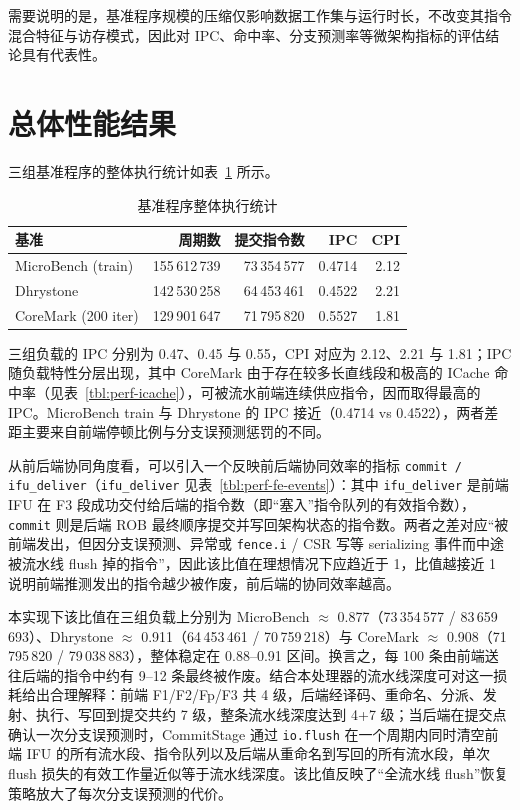 需要说明的是，基准程序规模的压缩仅影响数据工作集与运行时长，不改变其指令混合特征与访存模式，因此对 IPC、命中率、分支预测率等微架构指标的评估结论具有代表性。

\section{总体性能结果}\label{sec:perf-pipeline}

三组基准程序的整体执行统计如表~\ref{tbl:perf-overview} 所示。

\begin{table}[H]
  \centering
  \caption{基准程序整体执行统计}
  \label{tbl:perf-overview}
  \begin{tabular}{lrrrr}
    \toprule
    基准 & 周期数 & 提交指令数 & IPC & CPI \\
    \midrule
    MicroBench (train) & 155\,612\,739 & 73\,354\,577 & 0.4714 & 2.12 \\
    Dhrystone & 142\,530\,258 & 64\,453\,461 & 0.4522 & 2.21 \\
    CoreMark (200 iter) & 129\,901\,647 & 71\,795\,820 & 0.5527 & 1.81 \\
    \bottomrule
  \end{tabular}
\end{table}

三组负载的 IPC 分别为 0.47、0.45 与 0.55，CPI 对应为 2.12、2.21 与 1.81；IPC 随负载特性分层出现，其中 CoreMark 由于存在较多长直线段和极高的 ICache 命中率（见表~\ref{tbl:perf-icache}），可被流水前端连续供应指令，因而取得最高的 IPC。MicroBench train 与 Dhrystone 的 IPC 接近（0.4714 vs 0.4522），两者差距主要来自前端停顿比例与分支误预测惩罚的不同。

从前后端协同角度看，可以引入一个反映前后端协同效率的指标 \lstinline|commit / ifu_deliver|（\lstinline|ifu_deliver| 见表~\ref{tbl:perf-fe-events}）：其中 \lstinline|ifu_deliver| 是前端 IFU 在 F3 段成功交付给后端的指令数（即“塞入”指令队列的有效指令数），\lstinline|commit| 则是后端 ROB 最终顺序提交并写回架构状态的指令数。两者之差对应“被前端发出，但因分支误预测、异常或 \lstinline|fence.i| / CSR 写等 serializing 事件而中途被流水线 flush 掉的指令”，因此该比值在理想情况下应趋近于 1，比值越接近 1 说明前端推测发出的指令越少被作废，前后端的协同效率越高。

本实现下该比值在三组负载上分别为 MicroBench $\approx$ 0.877（73\,354\,577 / 83\,659\,693）、Dhrystone $\approx$ 0.911（64\,453\,461 / 70\,759\,218）与 CoreMark $\approx$ 0.908（71\,795\,820 / 79\,038\,883），整体稳定在 0.88--0.91 区间。换言之，每 100 条由前端送往后端的指令中约有 9--12 条最终被作废。结合本处理器的流水线深度可对这一损耗给出合理解释：前端 F1/F2/Fp/F3 共 4 级，后端经译码、重命名、分派、发射、执行、写回到提交共约 7 级，整条流水线深度达到 4+7 级；当后端在提交点确认一次分支误预测时，CommitStage 通过 \lstinline|io.flush| 在一个周期内同时清空前端 IFU 的所有流水段、指令队列以及后端从重命名到写回的所有流水段，单次 flush 损失的有效工作量近似等于流水线深度。该比值反映了“全流水线 flush”恢复策略放大了每次分支误预测的代价。

